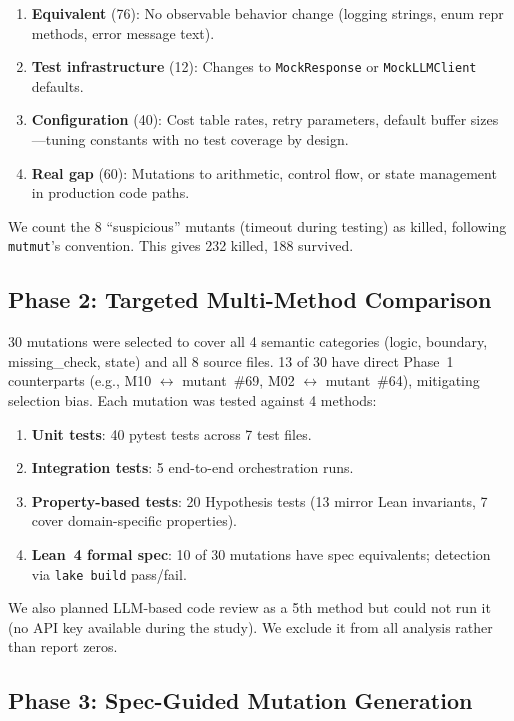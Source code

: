 \documentclass[11pt,a4paper]{article}
\begin{document}
\begin{enumerate}[nosep]
  \item \textbf{Equivalent} (76): No observable behavior change
    (logging strings, enum repr methods, error message text).
  \item \textbf{Test infrastructure} (12): Changes to
    \texttt{MockResponse} or \texttt{MockLLMClient} defaults.
  \item \textbf{Configuration} (40): Cost table rates, retry
    parameters, default buffer sizes---tuning constants with no test
    coverage by design.
  \item \textbf{Real gap} (60): Mutations to arithmetic, control
    flow, or state management in production code paths.
\end{enumerate}

We count the 8 ``suspicious'' mutants (timeout during testing)
as killed, following \texttt{mutmut}'s convention. This gives
232 killed, 188 survived.

\subsection{Phase 2: Targeted Multi-Method Comparison}

30 mutations were selected to cover all 4 semantic categories
(logic, boundary, missing\_check, state) and all 8 source files.
13 of 30 have direct Phase~1 counterparts (e.g., M10 $\leftrightarrow$
mutant~\#69, M02 $\leftrightarrow$ mutant~\#64), mitigating selection
bias. Each mutation was tested against 4 methods:

\begin{enumerate}[nosep]
  \item \textbf{Unit tests}: 40 pytest tests across 7 test files.
  \item \textbf{Integration tests}: 5 end-to-end orchestration runs.
  \item \textbf{Property-based tests}: 20 Hypothesis tests
    (13 mirror Lean invariants, 7 cover domain-specific properties).
  \item \textbf{Lean~4 formal spec}: 10 of 30 mutations have spec
    equivalents; detection via \texttt{lake build} pass/fail.
\end{enumerate}

We also planned LLM-based code review as a 5th method but could not
run it (no API key available during the study). We exclude it from
all analysis rather than report zeros.

\subsection{Phase 3: Spec-Guided Mutation Generation}
\label{sec:specguided-method}
\end{document}
